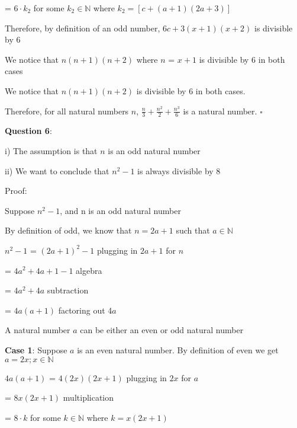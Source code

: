 \documentclass{article} %
\newcommand{\question}[2][]{\begin{flushleft}
        \textbf{Question #1}: \textit{#2}

\end{flushleft}}
\begin{document}
    \tabto*{5.24cm} = $6 \cdot k_{2}$ for some $k_{2} \in \mathbb{N}$ where $k_{2} = [c + (a+1)(2a+3)]$


    \tabto*{2cm} Therefore, by definition of an odd number, $6c + 3(x+1)(x+2)$ is divisible by 6

    \tabto*{1cm}We notice that $n(n + 1)(n + 2)$ where $n$ = $x + 1$ is divisible by 6 in both cases

    We notice that $n(n + 1)(n + 2)$ is divisible by 6 in both cases.

    Therefore, for all natural numbers $n$, $\frac{n}{3} + \frac{n^2}{2} + \frac{n^3}{6}$ is a natural number. $\square$

    \question[6]{}

    i) The assumption is that $n$ is an odd natural number

    ii) We want to conclude that $n^2 -1$ is always divisible by 8

    Proof:

    Suppose $n^2-1$, and n is an odd natural number
    
    By definition of odd, we know that $n = 2a+1$ such that $a \in \mathbb{N}$

    $n^2-1$ = $(2a+1)^2-1$ \tabto*{5cm}plugging in $2a + 1$ for $n$

    \tabto*{1.64cm} = $4a^2 + 4a + 1 -1$ \tabto*{5cm}algebra

    \tabto*{1.64cm} = $4a^2 + 4a$ \tabto*{5cm}subtraction

    \tabto*{1.64cm} = $4a(a + 1)$ \tabto*{5cm}factoring out 4$a$

    A natural number $a$ can be either an even or odd natural number 

    \vspace*{0.2cm}

    \textbf{Case 1}: Suppose $a$ is an even natural number. By definition of even we get $a = 2x; x \in \mathbb{N}$

    $4a(a + 1)$ = $4(2x)(2x + 1)$ \tabto*{5cm}plugging in $2x$ for $a$

    \tabto*{2.08cm} = $8x(2x + 1)$ \tabto*{5cm}multiplication

    \tabto*{2.08cm} = $8\cdot k$ for some $k \in \mathbb{N}$ where $k = x(2x + 1)$

\end{document}
